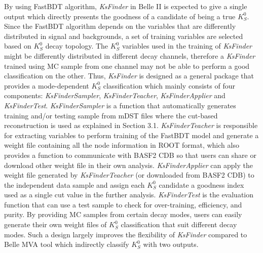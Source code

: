 By using FastBDT algorithm, \textit{KsFinder} in Belle II is expected to give a single output which directly presents the goodness of a candidate of being a true $K_S^0$. Since the FastBDT algorithm depends on the variables that are differently distributed in signal and backgrounds, a set of training variables are selected based on $K_S^0$ decay topology.  The $K_S^0$ variables used in the training of \textit{KsFinder} might be differently distributed in different decay channels, therefore a \textit{KsFinder} trained using MC sample from one channel may not be able to perform a good classification on the other. Thus, \textit{KsFinder} is designed as a general package that provides a mode-dependent $K_S^0$ classification which mainly consists of four components: \textit{KsFinderSampler}, \textit{KsFinderTeacher}, \textit{KsFinderApplier} and \textit{KsFinderTest}. \textit{KsFinderSampler} is a function that automatically generates training and/or testing sample from mDST files where the cut-based reconstruction is used as explained in Section 3.1. \textit{KsFinderTeacher} is responsible for extracting variables to perform training of the FastBDT model and generate a weight file containing all the node information in ROOT format, which also provides a function to communicate with BASF2 CDB so that users can share or download other weight file in their own analysis. \textit{KsFinderApplier} can apply the weight file generated by \textit{KsFinderTeacher} (or downloaded from BASF2 CDB) to the independent data sample and assign each $K_S^0$ candidate a goodness index used as a single cut value in the further analysis. \textit{KsFinderTest} is the evaluation function that can use a test sample to check for over-training, efficiency, and purity.  By providing MC samples from certain decay modes, users can easily generate their own weight files of $K_S^0$ classification that suit different decay modes. Such a design largely improves the flexibility of \textit{KsFinder} compared to Belle MVA tool which indirectly classify $K_S^0$ with two outputs. 

